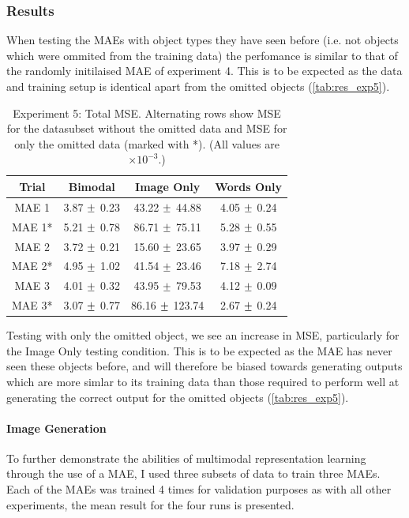 \subsubsection{Results}

When testing the MAEs with object types they have seen before (i.e. not objects which were ommited from the training data) the perfomance is similar to that of the randomly initilaised MAE of experiment 4. This is to be expected as the data and training setup is identical apart from the omitted objects (\autoref{tab:res_exp5}).
\begin{table}[h!]
\centering
	\begin{tabular}{|c|c|c|c|}
	\hline
\textbf{Trial} & 	\textbf{Bimodal} & 	\textbf{Image Only} 	& 	\textbf{Words Only} \\ \hline
MAE 1	&	3.87	$\mypm$	0.23	&	43.22	$\mypm$	44.88	&	4.05	$\mypm$	0.24	\\ \hline
MAE 1*	&	5.21	$\mypm$	0.78	&	86.71	$\mypm$	75.11	&	5.28	$\mypm$	0.55	\\ \hline
MAE 2	&	3.72	$\mypm$	0.21	&	15.60	$\mypm$	23.65	&	3.97	$\mypm$	0.29	\\ \hline
MAE 2*	&	4.95	$\mypm$	1.02	&	41.54	$\mypm$	23.46	&	7.18	$\mypm$	2.74	\\ \hline
MAE 3	&	4.01	$\mypm$	0.32	&	43.95	$\mypm$	79.53	&	4.12	$\mypm$	0.09	\\ \hline
MAE 3*	&	3.07	$\mypm$	0.77	&	86.16	$\mypm$	123.74	&	2.67	$\mypm$	0.24	\\ \hline
\end{tabular}
\caption{Experiment 5: Total MSE. Alternating rows show MSE for the datasubset without the omitted data and MSE for only the omitted data (marked with *). (All values are $\times10^{-3}$.)}
\label{tab:res_exp5}
\end{table}
Testing with only the omitted object, we see an increase in MSE, particularly for the Image Only testing condition. This is to be expected as the MAE has never seen these objects before, and will therefore be biased towards generating outputs which are more simlar to its training data than those required to perform well at generating the correct output for the omitted objects (\autoref{tab:res_exp5}).

\paragraph{Image Generation}
To further demonstrate the abilities of multimodal representation learning through the use of a MAE, I used three subsets of data to train three MAEs. Each of the MAEs was trained 4 times for validation purposes as with all other experiments, the mean result for the four runs is presented.

